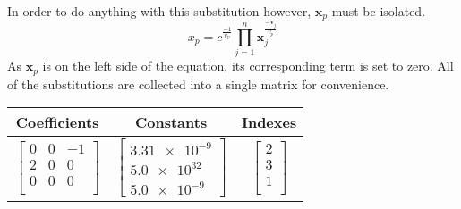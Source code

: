 \documentclass{article}
\newcommand{\vect}[1]{\bm{#1}}
\begin{document}
In order to do anything with this substitution however, $\vect{x}_p$ must be isolated.
\begin{equation*}
    x_p = c^{\frac{-1}{v_p}} \prod_{j=1}^{n}\vect{x}_j^{\frac{-\vect{v}_j}{v_p}}
\end{equation*}
As $\vect{x}_p$ is on the left side of the equation, its corresponding term is set to zero. All of the substitutions are collected into a single matrix for convenience.
\begin{center}
    \begin{tabular}{c|c|c}
    Coefficients & Constants & Indexes  \\
    \hline
    $\begin{bmatrix}
        0 & 0 & -1 \\
       2 & 0 & 0 \\
       0 & 0 & 0 \\
    \end{bmatrix}$  &
    $\begin{bmatrix}
        \num{3.31e-9} \\
       \num{5.0e32} \\
       \num{5.0e-9}
    \end{bmatrix}$  &
    $\begin{bmatrix}
        2 \\
       3 \\
       1\\
    \end{bmatrix}$
\end{tabular}
\end{center}
\end{document}
